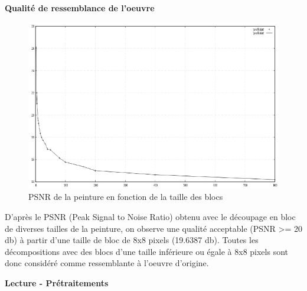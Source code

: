 \documentclass{beamer}
\begin{document}
\begin{frame}[t]
\begin{columns}[t]
\begin{column}{.49\linewidth}
\begin{block}{\centering \textbf{Qualité de ressemblance de l'oeuvre}}
                    \begin{center}
                        \begin{figure}[t]
                            \includegraphics[width=.5\linewidth]{rsc/psnr_ressemblance.png}
                            \caption{\centering PSNR de la peinture en fonction de la taille des blocs}
                        \end{figure}
                    \end{center}

                    D'après le PSNR (Peak Signal to Noise Ratio) obtenu avec le découpage en bloc de diverses tailles de la peinture, on observe une qualité acceptable (PSNR >= 20 db) à partir d'une taille de bloc de 8x8 pixels (19.6387 db).
                    Toutes les décompositions avec des blocs d'une taille inférieure ou égale à 8x8 pixels sont donc considéré comme ressemblante à l'oeuvre d'origine.

                    \vspace{0.5cm}
                \end{block}




                \begin{block}{\centering \textbf{Lecture - Prétraitements}}
                    \vspace{0.5cm}


\end{block}
\end{column}
\end{columns}
\end{frame}
\end{document}
